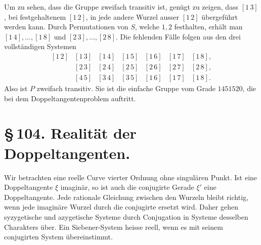 \documentclass[11pt]{article}
\providecommand{\pair}[2]{[#1\,#2]}
\begin{document}
Um zu sehen, dass die Gruppe zweifach transitiv ist, genügt zu zeigen, dass \(\pair{1}{3}\), bei festgehaltenem \(\pair{1}{2}\), in jede andere Wurzel ausser \(\pair{1}{2}\) übergeführt werden kann. Durch Permutationen von \(S\), welche \(1,2\) festhalten, erhält man \(\pair{1}{4},
\ldots,
\pair{1}{8}\) und \(\pair{2}{3},
\ldots,
\pair{2}{8}\). Die fehlenden Fälle folgen aus den drei vollständigen Systemen
\[
\begin{array}{lllllll}
\pair{1}{2}&\pair{1}{3}&\pair{1}{4}&\pair{1}{5}&\pair{1}{6}&\pair{1}{7}&\pair{1}{8},\\
\pair{1}{2}&\pair{2}{3}&\pair{2}{4}&\pair{2}{5}&\pair{2}{6}&\pair{2}{7}&\pair{2}{8},\\
\pair{1}{2}&\pair{4}{5}&\pair{3}{4}&\pair{3}{5}&\pair{1}{6}&\pair{1}{7}&\pair{1}{8}.
\end{array}
\]
Also ist \(P\) zweifach transitiv. Sie ist die einfache Gruppe vom Grade \(1451520\), die bei dem Doppeltangentenproblem auftritt.

\section*{\S\,104. Realität der Doppeltangenten.}

Wir betrachten eine reelle Curve vierter Ordnung ohne singulären Punkt. Ist eine Doppeltangente \(\xi\) imaginär, so ist auch die conjugirte Gerade \(\xi'\) eine Doppeltangente. Jede rationale Gleichung zwischen den Wurzeln bleibt richtig, wenn jede imaginäre Wurzel durch die conjugirte ersetzt wird. Daher gehen syzygetische und azygetische Systeme durch Conjugation in Systeme desselben Charakters über. Ein Siebener-System heisse reell, wenn es mit seinem conjugirten System übereinstimmt.
\end{document}
